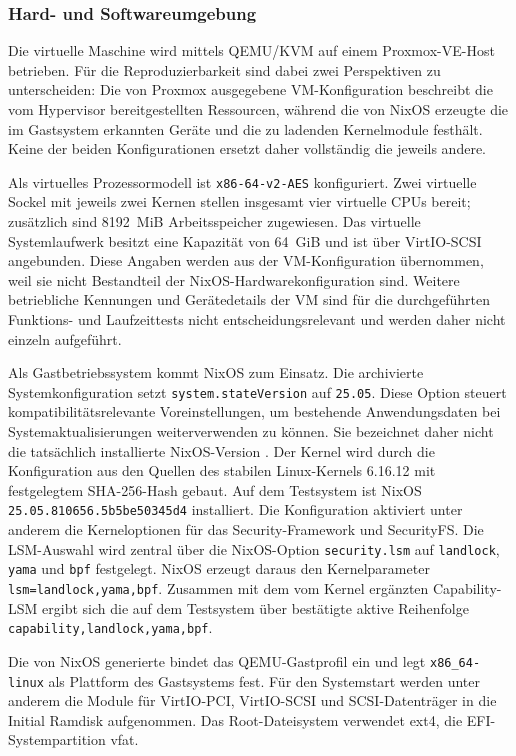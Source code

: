 \subsubsection{Hard- und Softwareumgebung}

Die virtuelle Maschine wird mittels QEMU/KVM auf einem Proxmox-VE-Host betrieben. Für die
Reproduzierbarkeit sind dabei zwei Perspektiven zu unterscheiden: Die von Proxmox ausgegebene
VM-Konfiguration beschreibt die vom Hypervisor bereitgestellten Ressourcen, während die von
NixOS erzeugte  die im Gastsystem erkannten Geräte und die zu
ladenden Kernelmodule festhält. Keine der beiden Konfigurationen ersetzt daher vollständig die
jeweils andere.

Als virtuelles Prozessormodell ist \texttt{x86-64-v2-AES} konfiguriert. Zwei virtuelle Sockel mit
jeweils zwei Kernen stellen insgesamt vier virtuelle CPUs bereit; zusätzlich sind 8192~MiB
Arbeitsspeicher zugewiesen. Das virtuelle Systemlaufwerk besitzt eine Kapazität von 64~GiB und ist
über VirtIO-SCSI angebunden. Diese Angaben werden aus der VM-Konfiguration übernommen, weil sie
nicht Bestandteil der NixOS-Hardwarekonfiguration sind. Weitere betriebliche Kennungen und
Gerätedetails der VM sind für die durchgeführten Funktions- und Laufzeittests nicht
entscheidungsrelevant und werden daher nicht einzeln aufgeführt.

Als Gastbetriebssystem kommt NixOS zum Einsatz. Die archivierte Systemkonfiguration setzt
\texttt{system.stateVersion} auf \texttt{25.05}. Diese Option steuert kompatibilitätsrelevante
Voreinstellungen, um bestehende Anwendungsdaten bei Systemaktualisierungen weiterverwenden zu
können. Sie bezeichnet daher nicht die tatsächlich installierte NixOS-Version
\citep{nixosStateVersion}. Der Kernel wird durch die Konfiguration aus den Quellen des stabilen
Linux-Kernels 6.16.12 mit festgelegtem SHA-256-Hash gebaut. Auf dem Testsystem ist NixOS
\texttt{25.05.810656.5b5be50345d4} installiert. Die Konfiguration aktiviert unter
anderem die Kerneloptionen für das Security-Framework und SecurityFS. Die LSM-Auswahl wird
zentral über die NixOS-Option \texttt{security.lsm} auf \texttt{landlock}, \texttt{yama} und
\texttt{bpf} festgelegt. NixOS erzeugt daraus den Kernelparameter
\texttt{lsm=landlock,yama,bpf}. Zusammen mit dem vom Kernel ergänzten Capability-LSM ergibt
sich die auf dem Testsystem über  bestätigte aktive Reihenfolge
\texttt{capability,landlock,yama,bpf}.

Die von NixOS generierte  bindet das QEMU-Gastprofil ein und
legt \texttt{x86\_64-linux} als Plattform des Gastsystems fest. Für den Systemstart werden unter
anderem die Module für VirtIO-PCI, VirtIO-SCSI und SCSI-Datenträger in die Initial Ramdisk
aufgenommen. Das Root-Dateisystem verwendet ext4, die EFI-Systempartition vfat.

